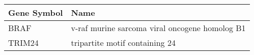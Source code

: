 \begin{tabular}{ll}
\toprule
Gene Symbol &                                           Name \\
\midrule
       BRAF & v-raf murine sarcoma viral oncogene homolog B1 \\
     TRIM24 &                 tripartite motif containing 24 \\
\bottomrule
\end{tabular}
